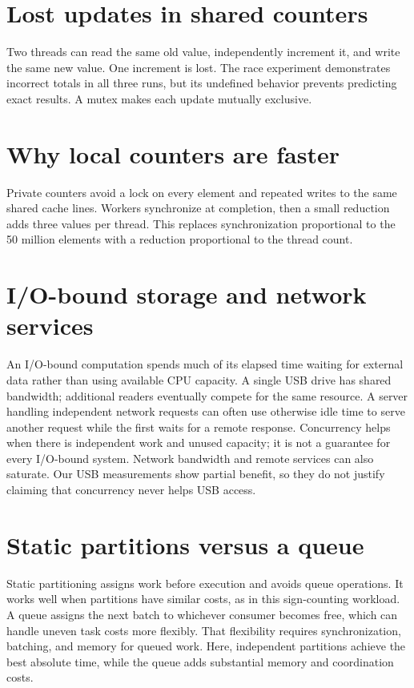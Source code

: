 \documentclass{../latex/utmreport}
\begin{document}
\section{Lost updates in shared counters}
Two threads can read the same old value, independently increment it, and write
the same new value. One increment is lost. The race experiment demonstrates
incorrect totals in all three runs, but its undefined behavior prevents
predicting exact results. A mutex makes each update mutually exclusive.

\section{Why local counters are faster}
Private counters avoid a lock on every element and repeated writes to the same
shared cache lines. Workers synchronize at completion, then a small reduction
adds three values per thread. This replaces synchronization proportional to the
50 million elements with a reduction proportional to the thread count.

\section{I/O-bound storage and network services}
An I/O-bound computation spends much of its elapsed time waiting for external
data rather than using available CPU capacity. A single USB drive has shared
bandwidth; additional readers eventually compete for the same resource.
A server handling independent network requests can often use otherwise idle
time to serve another request while the first waits for a remote response.
Concurrency helps when there is independent work and unused capacity; it is
not a guarantee for every I/O-bound system. Network bandwidth and remote
services can also saturate. Our USB measurements show partial benefit, so they
do not justify claiming that concurrency never helps USB access.

\section{Static partitions versus a queue}
Static partitioning assigns work before execution and avoids queue operations.
It works well when partitions have similar costs, as in this sign-counting
workload. A queue assigns the next batch to whichever consumer becomes free,
which can handle uneven task costs more flexibly. That flexibility requires
synchronization, batching, and memory for queued work. Here, independent
partitions achieve the best absolute time, while the queue adds substantial
memory and coordination costs.
\end{document}
